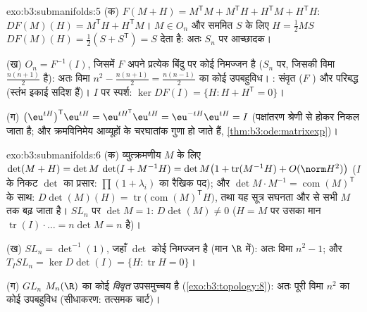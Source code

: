 \begin{solution}{exo:b3:submanifolds:5}
(क) $F(M + H) = M^{\mathsf T}M + M^{\mathsf T}H + H^{\mathsf
T}M + H^{\mathsf T}H$: $DF(M)(H) = M^{\mathsf T}H +
H^{\mathsf T}M$। $M \in O_n$ और सममित $S$ के लिए $H =
\frac12MS$ $DF(M)(H) = \frac12(S + S^{\mathsf T}) = S$ देता है: अतः
$S_n$ पर आच्छादक।

(ख) $O_n = F^{-1}(I)$, जिसमें $F$ अपने प्रत्येक बिंदु पर कोई निमज्जन है ($S_n$
पर, जिसकी विमा $\frac{n(n+1)}2$ है): अतः विमा $n^2 - \frac{n(n+1)}2 =
\frac{n(n-1)}2$ का कोई उपबहुविध। : संवृत
($F$ ) और परिबद्ध (स्तंभ इकाई सदिश हैं)। $I$ पर स्पर्श: $\ker DF(I) =
\{H : H + H^{\mathsf T} = 0\}$।

(ग) $\bigl(\eu^{tH}\bigr)^{\mathsf T}\eu^{tH} =
\eu^{tH^{\mathsf T}}\eu^{tH} = \eu^{-tH}\eu^{tH} = I$ (पक्षांतरण श्रेणी से होकर निकल जाता है; और क्रमविनिमेय
आव्यूहों के चरघातांक गुणा हो जाते हैं, \cref{thm:b3:ode:matrixexp})।
\end{solution}

\begin{solution}{exo:b3:submanifolds:6}
(क) व्युत्क्रमणीय $M$ के लिए $\det(M + H) = \det M\,\det(I + M^{-1}H) = \det M\bigl(1
+ \operatorname{tr}(M^{-1}H) + O(\norm H^2)\bigr)$ ($I$ के निकट $\det$ का प्रसार:
$\prod(1 + \lambda_i)$ का रैखिक पद); और $\det M\cdot M^{-1} =
\operatorname{com}(M)^{\mathsf T}$ के साथ: $D\det(M)(H) = \operatorname{tr}\bigl(\operatorname{com}
(M)^{\mathsf T}H\bigr)$, तथा यह सूत्र सघनता और
 से सभी $M$ तक बढ़ जाता है। $SL_n$ पर $\det M = 1$: $D\det(M) \ne 0$ ($H = M$ पर
उसका मान $\operatorname{tr}(I)\cdot\dots = n\det M = n$ है)।

(ख) $SL_n = \det^{-1}(1)$, जहाँ $\det$ कोई निमज्जन है (मान $\R$ में): अतः विमा $n^2 - 1$;
और $T_ISL_n = \ker
D\det(I) = \{H : \operatorname{tr}H = 0\}$।

(ग) $GL_n$ $M_n(\R)$ का कोई \emph{विवृत} उपसमुच्चय है (\cref{exo:b3:topology:8}): अतः पूरी
विमा $n^2$ का कोई उपबहुविध (सीधाकरण: तत्समक चार्ट)।
\end{solution}

